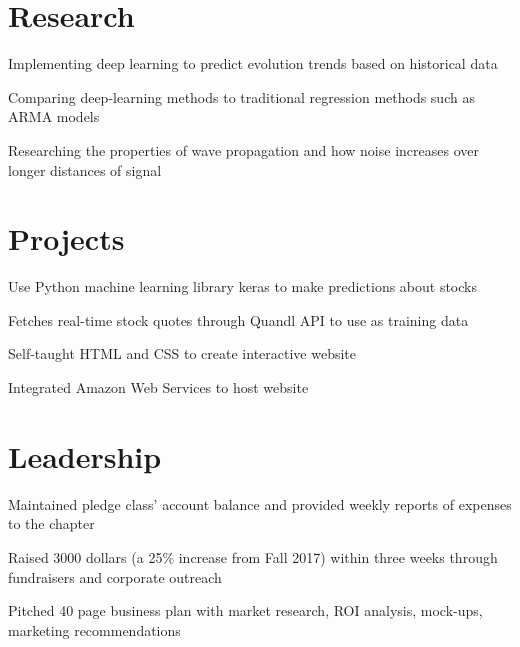 \documentclass[]{deedy-resume-openfont}
\begin{document}
\begin{minipage}[t]{0.66\textwidth}
\section{Research}
\begin{tightemize} 
\item Implementing deep learning to predict evolution trends based on historical data
\item Comparing deep-learning methods to traditional regression methods such as ARMA models
\item Researching the properties of wave propagation and how noise increases over longer distances of signal
\end{tightemize}
\sectionsep


\section{Projects}
\begin{tightemize} 
\item Use Python machine learning library keras to make predictions about stocks
\item Fetches real-time stock quotes through Quandl API to use as training data
\end{tightemize}
\begin{tightemize} 
\item Self-taught HTML and CSS to create interactive website
\item Integrated Amazon Web Services to host website
\end{tightemize}
\sectionsep


\section{Leadership}
\begin{tightemize} 
\item Maintained pledge class’ account balance and provided weekly reports of expenses to the chapter
\item Raised 3000 dollars (a 25\% increase from Fall 2017) within three weeks through fundraisers and corporate outreach
\item Pitched 40 page business plan with market research, ROI analysis, mock-ups, marketing recommendations
\end{tightemize}
\sectionsep



\end{minipage} 
\end{document}

